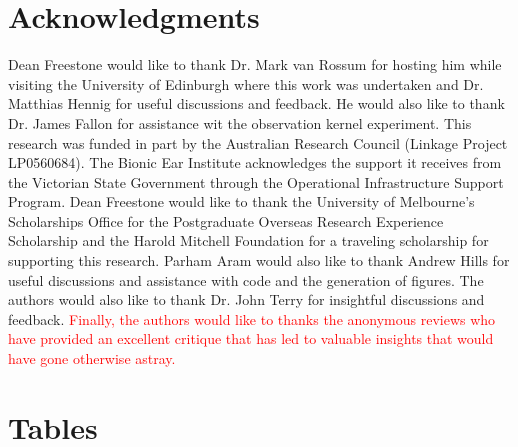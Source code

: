 \documentclass[review,authoryear,3p]{elsarticle}
\newcommand{\dean}[1]{\textcolor{red}{#1}}
\begin{document}
\section{Acknowledgments}
Dean Freestone would like to thank Dr. Mark van Rossum for hosting him while visiting the University of Edinburgh where this work was undertaken and Dr. Matthias Hennig for useful discussions and feedback. He would also like to thank Dr. James Fallon for assistance wit the observation kernel experiment. This research was funded in part by the Australian Research Council (Linkage Project LP0560684). The Bionic Ear Institute acknowledges the support it receives from the Victorian State Government through the Operational Infrastructure Support Program. Dean Freestone would like to thank the University of Melbourne's Scholarships Office for the Postgraduate Overseas Research Experience Scholarship and the Harold Mitchell Foundation for a traveling scholarship for supporting this research. Parham Aram would also like to thank Andrew Hills for useful discussions and assistance with code and the generation of figures. The authors would also like to thank Dr. John Terry for insightful discussions and feedback. \dean{Finally, the authors would like to thanks the anonymous reviews who have provided an excellent critique that has led to valuable insights that would have gone otherwise astray.}

 


\clearpage
\newpage
\section*{Tables}

\singlespacing
\end{document}
